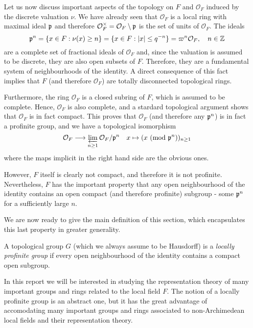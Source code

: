 Let us now discuss important aspects of the topology on $F$ and $\mathcal{O}_F$ induced by the discrete valuation $\nu$. We have already seen that $\mathcal{O}_F$ is a local ring with maximal ideal $\mathfrak{p}$ and therefore $\mathcal{O}_F^\times=\mathcal{O}_F\setminus\mathfrak{p}$ is the set of units of $\mathcal{O}_F$. The ideals 
$$\mathfrak{p}^n=\{x\in F:\nu(x)\geq n\}=\{x\in F: |x|\leq q^{-n}\}=\varpi^n \mathcal{O}_F,\quad n\in\mathbb{Z}$$
are a complete set of fractional ideals of $\mathcal{O}_F$ and, since the valuation is assumed to be discrete, they are also open subsets of $F$.
Therefore, they are a fundamental system of neighbourhoods of the identity. A direct consequence of this fact implies that $F$ (and therefore $\mathcal{O}_F$) are totally disconnected topological rings.

Furthermore, the ring $\mathcal{O}_F$ is a closed subring of $F$, which is assumed to be complete. Hence, $\mathcal{O}_F$ is also complete, and a stardard topological argument shows that $\mathcal{O}_F$ is in fact compact. This proves that $\mathcal{O}_F$ (and therefore any $\mathfrak{p}^n$) is in fact a profinite group, and we have a topological isomorphism 
$$\mathcal{O}_F\longrightarrow\varprojlim_{n\geq 1} \mathcal{O}_F/\mathfrak{p}^n\quad x\mapsto (x\ (\textrm{mod }{\mathfrak{p}^n}))_{n\geq 1}$$
where the maps implicit in the right hand side are the obvious ones.

However, $F$ itself is clearly not compact, and therefore it is not profinite. Nevertheless, $F$ has the important property that any open neighbourhood of the identity contains an open compact (and therefore profinite) subgroup - some $\mathfrak{p}^n$ for a sufficiently large $n$.

We are now ready to give the main definition of this section, which encapsulates this last property in greater generality.

\begin{defn}\label{loc_prof_grp}
    A topological group $G$ (which we always assume to be Hausdorff) is a \textit{locally profinite group} if every open neighbourhood of the identity contains a compact open subgroup. 
\end{defn}

In this report we will be interested in studying the representation theory of many important groups and rings related to the local field $F$. The notion of a locally profinite group is an abstract one, but it has the great advantage of accomodating many important groups and rings associated to non-Archimedean local fields and their representation theory.

